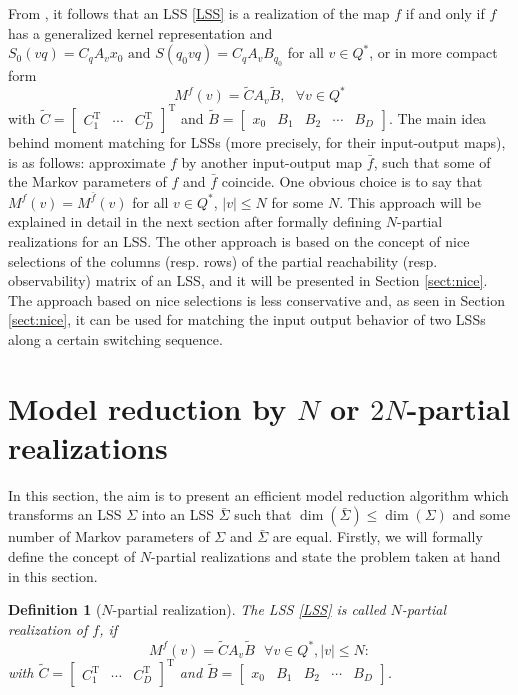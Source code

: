 \documentclass[journal]{IEEEtran}
\newcommand{\QNUM}{D}
\newtheorem{Definition}{Definition}
\begin{document}
From \cite{MP:BigArticlePartI}, it follows that an LSS \eqref{LSS} is a realization of the map $f$ if and only if $f$ has a generalized kernel representation and $S_0(vq)=C_qA_vx_0 \mbox{ and } S(q_0vq)=C_qA_vB_{q_0}$ for all $v \in Q^{*}$, or in more compact form
\begin{equation}
	\label{eq:markov1}
	M^f(v)=\widetilde{C}A_v\widetilde{B}, \mbox{ } \forall v \in Q^{*}
\end{equation}
with $\widetilde{C}=\begin{bmatrix} C_1^{\mathrm{T}} & \cdots & C_{\QNUM}^{\mathrm{T}} \end{bmatrix}^{\mathrm{T}}$ and $\widetilde{B}= \begin{bmatrix} x_0 & B_1 & B_2 & \cdots & B_D \end{bmatrix}$.
The main idea behind moment matching for LSSs (more precisely, for their input-output maps), is as follows: approximate $f$ by another input-output map $\bar{f}$, such that some of the Markov parameters of $f$ and $\bar{f}$ coincide. One obvious choice is to say that $M^{f}(v)=M^{\bar{f}}(v)$ for all $v \in Q^{*}$, $|v| \le N$ for some $N$. This approach will be explained in detail in the next section after formally defining $N$-partial realizations for an LSS. The other approach is based on the concept of nice selections of the columns (resp. rows) of the partial reachability (resp. observability) matrix of an LSS, and it will be presented in Section \ref{sect:nice}. The approach based on nice selections is less conservative and, as seen in Section \ref{sect:nice}, it can be used for matching the input output behavior of two LSSs along a certain switching sequence.

\section{Model reduction by $N$ or $2N$-partial realizations} \label{sect:Npart}

In this section, the aim is to present an efficient  model reduction algorithm which transforms an LSS $\Sigma$ into an LSS $\bar{\Sigma}$ such that $\dim (\bar{\Sigma}) \le \dim (\Sigma)$ and some number of Markov parameters of $\Sigma$ and $\bar{\Sigma}$ are equal. Firstly, we will formally define the concept of $N$-partial realizations and state the problem taken at hand in this section.



\begin{Definition}[$N$-partial realization] \label{def:Npartial}
	The LSS \eqref{LSS} is called \emph{$N$-partial realization} of $f$, if
	\[ M^f(v)=\widetilde{C}A_v\widetilde{B} \mbox{ } \forall v \in Q^{*}, |v| \le N: \]
	with $\widetilde{C}=\begin{bmatrix} C_1^{\mathrm{T}} & \cdots & C_{\QNUM}^{\mathrm{T}} \end{bmatrix}^{\mathrm{T}}$ and $\widetilde{B}=\begin{bmatrix} x_0 & B_1 & B_2 & \cdots & B_{\QNUM} \end{bmatrix}$.
\end{Definition}
\end{document}
